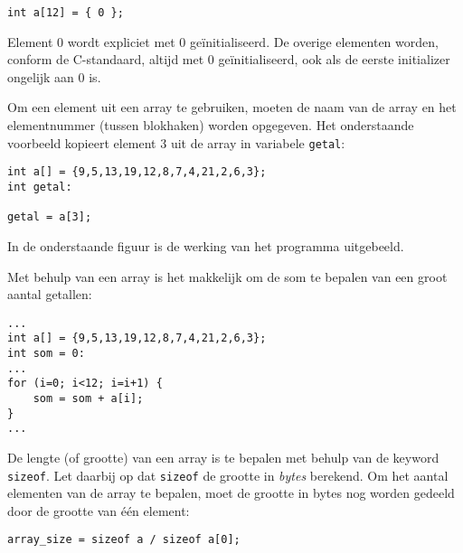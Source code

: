 \documentclass[a4paper,10pt,fleqn,twoside]{article}
\begin{document}
\begin{lstlisting}
int a[12] = { 0 };
\end{lstlisting}

Element 0 wordt expliciet met 0 geïnitialiseerd. De overige elementen worden, conform de C-standaard, altijd met 0 geïnitialiseerd, ook als de eerste initializer ongelijk aan 0 is.


 Om een element uit een array te gebruiken, moeten de naam van de array en het elementnummer (tussen blokhaken) worden opgegeven. Het onderstaande voorbeeld kopieert element 3 uit de array in variabele \lstinline|getal|:

\begin{lstlisting}
int a[] = {9,5,13,19,12,8,7,4,21,2,6,3};
int getal:

getal = a[3];
\end{lstlisting}

In de onderstaande figuur is de werking van het programma uitgebeeld.

\begin{figure}[!ht]
\centering
{}
\end{figure}

Met behulp van een array is het makkelijk om de som te bepalen van een groot aantal getallen:

\begin{lstlisting}
...
int a[] = {9,5,13,19,12,8,7,4,21,2,6,3};
int som = 0:
...
for (i=0; i<12; i=i+1) {
	som = som + a[i];
}
...
\end{lstlisting}

De lengte (of grootte) van een array is te bepalen met behulp van de keyword \lstinline|sizeof|. Let daarbij op dat \lstinline|sizeof| de grootte in \textsl{bytes} berekend. Om het aantal elementen van de array te bepalen, moet de grootte in bytes nog worden gedeeld door de grootte van één element:

\begin{lstlisting}
array_size = sizeof a / sizeof a[0];
\end{lstlisting}
\end{document}
